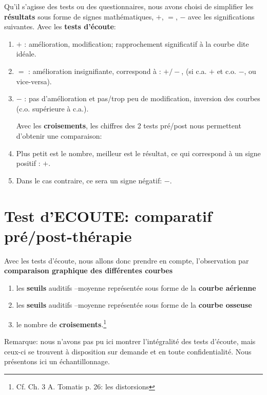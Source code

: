 Qu'il s'agisse des tests ou des questionnaires, nous avons choisi de
simplifier les \textbf{résultats} sous forme de signes
mathématiques, $+$, $=$, $-$ avec les significations suivantes.
Avec les \textbf{tests d'écoute}:
\begin{enumerate}
\item$+$   : amélioration, modification;  rapprochement significatif à la courbe dite idéale.
\item$=$   : amélioration insignifiante, correspond à : $+/-$, (si c.a. $ + $ et c.o. $-$, ou vice-versa).

\item$-$   : pas d'amélioration et pas/trop peu  de modification, inversion
des courbes (c.o. supérieure à c.a.).

  Avec les \textbf{croisements}, les chiffres des 2 tests pré/post
  nous permettent d'obtenir une comparaison:
  \item Plus petit est le nombre, meilleur est le résultat, ce qui correspond à un signe positif : $+$.
\item Dans le
  cas contraire, ce sera un signe négatif: $-$.

\end{enumerate}


 \section{Test d'ECOUTE: comparatif pré/post-thérapie }
Avec les tests d'écoute, nous
allons donc prendre en compte, l'observation par \textbf{comparaison graphique des différentes
  courbes}

\begin{enumerate}
 \item   les \textbf{seuils} auditifs --moyenne
représentée sous forme de la  \textbf{courbe aérienne}
\item   les \textbf{seuils} auditifs --moyenne
représentée sous forme de la \textbf{courbe osseuse}
\item le nombre de
\textbf{croisements}.\footnote{Cf. Ch. 3 A. Tomatis p. 26: les distorsions}

\end{enumerate}


Remarque: nous n'avons pas pu ici montrer l'intégralité des tests d'écoute, mais ceux-ci se trouvent à disposition sur demande et en toute confidentialité.
Nous présentons ici un échantillonnage.

